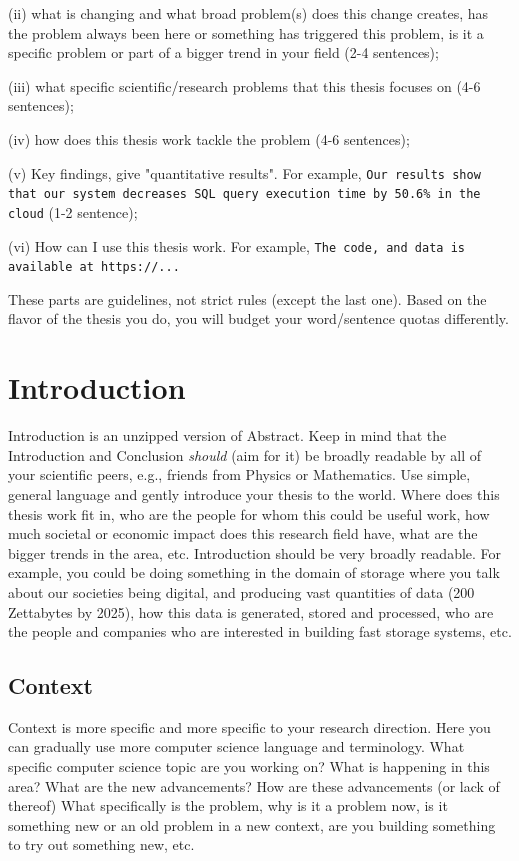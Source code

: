 \documentclass[11pt]{article}
\begin{document}
\noindent (ii) what is changing and what broad problem(s) does this change creates, has the problem always been here or something has triggered this problem, is it a specific problem or part of a bigger trend in your field (2-4 sentences); 

\noindent (iii) what specific scientific/research problems that this thesis focuses on (4-6 sentences); 

\noindent (iv) how does this thesis work tackle the problem (4-6 sentences); 

\noindent (v) Key findings, give "quantitative results". For example, \texttt{Our results show that our system decreases SQL query execution time by 50.6\% in the cloud} (1-2 sentence); 

\noindent (vi) How can I use this thesis work. For example, \texttt{The code, and data is available at https://...}  


These parts are guidelines, not strict rules (except the last one). Based on the flavor of the thesis you do, you will budget your word/sentence quotas differently. 

\newpage 
\section{Introduction} 
Introduction is an unzipped version of Abstract. Keep in mind that the Introduction and Conclusion \textit{should} (aim for it) be broadly readable by all of your scientific peers, e.g., friends from Physics or Mathematics. Use simple, general language and gently introduce your thesis to the world. Where does this thesis work fit in, who are the people for whom this could be useful work, how much societal or economic impact does this research field have, what are the bigger trends in the area, etc. Introduction should be very broadly readable. For example, you could be doing something in the domain of storage where you talk about our societies being digital, and producing vast quantities of data (200 Zettabytes by 2025), how this data is generated, stored and processed, who are the people and companies who are interested in building fast storage systems, etc. 
\subsection{Context}
Context is more specific and more specific to your research direction. Here you can gradually use more computer science language and terminology. What specific computer science topic are you working on? What is happening in this area? What are the new advancements? How are these advancements (or lack of thereof) What specifically is the problem, why is it a problem now, is it something new or an old problem in a new context, are you building something to try out something new, etc. 
\end{document}
